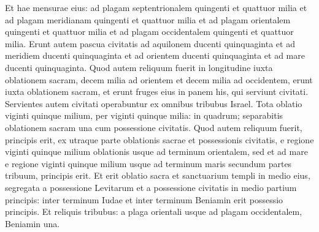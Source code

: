 \begin{biblechapter}
\begin{biblechapter}
\begin{biblechapter}
\begin{biblechapter}
\begin{biblechapter}
\begin{biblechapter}
\begin{biblechapter}
\begin{biblechapter}
\begin{biblechapter}
\begin{biblechapter}
\begin{biblechapter}
\begin{biblechapter}
\begin{biblechapter}
\begin{biblechapter}
\begin{biblechapter}
\begin{biblechapter}
\begin{biblechapter}
\begin{biblechapter}
\begin{biblechapter}
\begin{biblechapter}
\begin{biblechapter}
\begin{biblechapter}
\begin{biblechapter}
\begin{biblechapter}
\begin{biblechapter}
\begin{biblechapter}
\begin{biblechapter}
\begin{biblechapter}
\begin{biblechapter}
\begin{biblechapter}
\begin{biblechapter}
\begin{biblechapter}
\begin{biblechapter}
\begin{biblechapter}
\begin{biblechapter}
\begin{biblechapter}
\begin{biblechapter}
\begin{biblechapter}
\begin{biblechapter}
\begin{biblechapter}
\begin{biblechapter}
\begin{biblechapter}
\begin{biblechapter}
\begin{biblechapter}
\begin{biblechapter}
\begin{biblechapter}
\begin{biblechapter}
\begin{biblechapter}
\verse Et hae mensurae eius: ad plagam septentrionalem quingenti et quattuor milia et ad plagam meridianam quingenti et quattuor milia et ad plagam orientalem quingenti et quattuor milia et ad plagam occidentalem quingenti et quattuor milia. 
\verse Erunt autem pascua civitatis ad aquilonem ducenti quinquaginta et ad meridiem ducenti quinquaginta et ad orientem ducenti quinquaginta et ad mare ducenti quinquaginta. 
\verse Quod autem reliquum fuerit in longitudine iuxta oblationem sacram, decem milia ad orientem et decem milia ad occidentem, erunt iuxta oblationem sacram, et erunt fruges eius in panem his, qui serviunt civitati. 
\verse Servientes autem civitati operabuntur ex omnibus tribubus Israel. 
\verse Tota oblatio viginti quinque milium, per viginti quinque milia: in quadrum; separabitis oblationem sacram una cum possessione civitatis. 
\verse Quod autem reliquum fuerit, principis erit, ex utraque parte oblationis sacrae et possessionis civitatis, e regione viginti quinque milium oblationis usque ad terminum orientalem, sed et ad mare e regione viginti quinque milium usque ad terminum maris secundum partes tribuum, principis erit. Et erit oblatio sacra et sanctuarium templi in medio eius, 
\verse segregata a possessione Levitarum et a possessione civitatis in medio partium principis: inter terminum Iudae et inter terminum Beniamin erit possessio principis.
 \verse Et reliquis tribubus: a plaga orientali usque ad plagam occidentalem, Beniamin una. 

\end{biblechapter}
\end{biblechapter}
\end{biblechapter}
\end{biblechapter}
\end{biblechapter}
\end{biblechapter}
\end{biblechapter}
\end{biblechapter}
\end{biblechapter}
\end{biblechapter}
\end{biblechapter}
\end{biblechapter}
\end{biblechapter}
\end{biblechapter}
\end{biblechapter}
\end{biblechapter}
\end{biblechapter}
\end{biblechapter}
\end{biblechapter}
\end{biblechapter}
\end{biblechapter}
\end{biblechapter}
\end{biblechapter}
\end{biblechapter}
\end{biblechapter}
\end{biblechapter}
\end{biblechapter}
\end{biblechapter}
\end{biblechapter}
\end{biblechapter}
\end{biblechapter}
\end{biblechapter}
\end{biblechapter}
\end{biblechapter}
\end{biblechapter}
\end{biblechapter}
\end{biblechapter}
\end{biblechapter}
\end{biblechapter}
\end{biblechapter}
\end{biblechapter}
\end{biblechapter}
\end{biblechapter}
\end{biblechapter}
\end{biblechapter}
\end{biblechapter}
\end{biblechapter}
\end{biblechapter}
